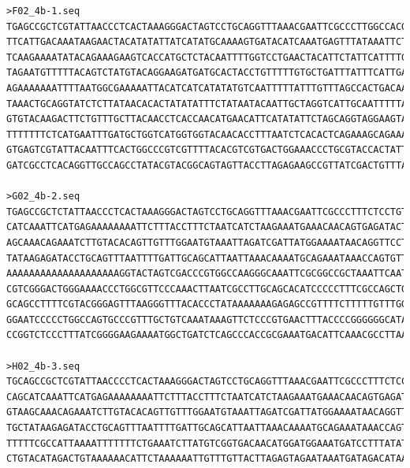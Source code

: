 \begin{verbatim}
>F02_4b-1.seq
TGAGCCGCTCGTATTAACCCTCACTAAAGGGACTAGTCCTGCAGGTTTAAACGAATTCGCCCTTGGCCACGCGTCGACTAGTACTTTTTTTTTTTTTTTTTTTTTCCAAAGTTTTTATT
TTCATTGACAAATAAGAACTACATATATTATCATATGCAAAAGTGATACATCAAATGAGTTTATAAATTCTAACATAGCACTTTTGCACATATACTTAATAGTTGACTTTTAGTGATAT
TCAAGAAAATATACAGAAAGAAGTCACCATGCTCTACAATTTTGGTCCTGAACTACATTCTATTCATTTTGCATTTTTTATGTCTATCATTTATTCTACTCTAAGTAACAAACAATTTT
TAGAATGTTTTTACAGTCTATGTACAGGAAGATGATGCACTACCTGTTTTTGTGCTGATTTATTTCATTGAAAATATAAAGGATCATTTCCATCCATGTTGTCACCGACATAAGATTTC
AGAAAAAAATTTTAATGGCGAAAAATTACATCATCATATATGTCAATTTTTATTTGTTTAGCCACTGACAAACACTGGTTTATTTCTGCATTTTGTTTAATTAATGCTGCAATCAAAAT
TAAACTGCAGGTATCTCTTATAACACACTATATATTTCTATAATACAATTGCTAGGTCATTGCAATTTTTAGGAACCTGTTATTTTCCATAATCGATCTAATTTACATTCCAAACAACT
GTGTACAAGACTTCTGTTTGCTTACAACCTCACCAACATGAACATTCATATATTCTAGCAGGTAGGAAGTAGTATCTCACTGTTGTTTCATTTCTTAGATGATTAGAAAGGTAAAGAAT
TTTTTTTCTCATGAATTTGATGCTGGTCATGGTGGTACAACACCTTTAATCTCACACTCAGAAAGCAGAAACAGGAGAAAGGGCGAATTCGCGGCCCGCTAAATTCAATTCGCCCTATA
GTGAGTCGTATTACAATTTCACTGGCCCGTCGTTTTACACGTCGTGACTGGAAACCCTGCGTACCACTATTCGCTGCAGCACATCCCCATTCGCAGCTGCGTATAGCGAGAGCCCGCAC
GATCGCCTCACAGGTTGCCAGCCTATACGTACGGCAGTAGTTACCTTAGAGAAGCCGTTATCGACTGTTTATGA

>G02_4b-2.seq
TGAGCCGCTCTATTAACCCTCACTAAAGGGACTAGTCCTGCAGGTTTAAACGAATTCGCCCTTTCTCCTGTTTCTGCTTTCTGAGTGTGAGATTAAAGGTGTTGTACCACCATGACCAG
CATCAAATTCATGAGAAAAAAAATTCTTTACCTTTCTAATCATCTAAGAAATGAAACAACAGTGAGATACTACTTCCTACCTGCTAGAATATATGAATGTTCATGTTGGTGAGGTTGTA
AGCAAACAGAAATCTTGTACACAGTTGTTTGGAATGTAAATTAGATCGATTATGGAAAATAACAGGTTCCTAAAAATTGCAATGACCTAGCAATTGTATTATAGAAATATATAGTGTGT
TATAAGAGATACCTGCAGTTTAATTTTGATTGCAGCATTAATTAAACAAAATGCAGAAATAAACCAGTGTTTGTCAGTGGCTAAAAAAAAAAAAAAAAAAAAAAAAAAAAAAAAAAAAT
AAAAAAAAAAAAAAAAAAAAGGTACTAGTCGACCCGTGGCCAAGGGCAAATTCGCGGCCGCTAAATTCAATTCCCCCTATAGTGAGTCGTATTACAATTCACTGGCCGTCGTTTTACAA
CGTCGGGACTGGGAAAACCCTGGCGTTCCCAAACTTAATCGCCTTGCAGCACATCCCCCTTTCGCCAGCTGGCGTAATAGCGAAAAGGCCCGCACCGTTCGCCCCTTCCCAACATTTGC
GCAGCCTTTTCGTACGGGAGTTTAAGGGTTTACACCCTATAAAAAAAGAGAGCCGTTTTCTTTTTGTTTGGGGATGTACAGAATTGATTTTTTTTGACCCCCCGGGGCGACGGGATGGG
GGAATCCCCCTGGCCAGTGCCCGTTTGCTGTCAAATAAAGTTCTCCCGTGAACTTTACCCCGGGGGGCATATCCGGGATTGAAAGCTGGCCCATTATGTCCCCCCATTTGGCCATGGTG
CCGGTCTCCCTTTATCGGGGAAGAAAATGGCTGATCTCAGCCCACCGCGAAATGACATTCAAACGCCTTAACCTGATGTTTCTGGGGAAATATTA

>H02_4b-3.seq
TGCAGCCGCTCGTATTAACCCCTCACTAAAGGGACTAGTCCTGCAGGTTTAAACGAATTCGCCCTTTCTCCTGTTTCTGCTTTCTGAGTGTGAGATTAAAGGTGTTGTACCACCATGAC
CAGCATCAAATTCATGAGAAAAAAAATTCTTTACCTTTCTAATCATCTAAGAAATGAAACAACAGTGAGATACTACTTCCTACCTGCTAGAATATATGAATGTTCATGCTGGTGAGGTT
GTAAGCAAACAGAAATCTTGTACACAGTTGTTTGGAATGTAAATTAGATCGATTATGGAAAATAACAGGTTCCTAAAAATTGCAATGACCTAGCAATTGTATTATAGAAATATATAGTG
TGCTATAAGAGATACCTGCAGTTTAATTTTGATTGCAGCATTAATTAAACAAAATGCAGAAATAAACCAGTGTTTGTCAGTGGCTAAACAAATAAAAATTGACATATATGATGATGTAA
TTTTTCGCCATTAAAATTTTTTTCTGAAATCTTATGTCGGTGACAACATGGATGGAAATGATCCTTTATATTTTCAATGAAATAAAATCAGCACAAAAAACAGGTAGTGCATCATCTTC
CTGTACATAGACTGTAAAAAACATTCTAAAAAATTGTTTGTTACTTAGAGTAGAATAAATGATAGACATAAAAATGCAAATGAAAT
\end{verbatim}
\endgroup


